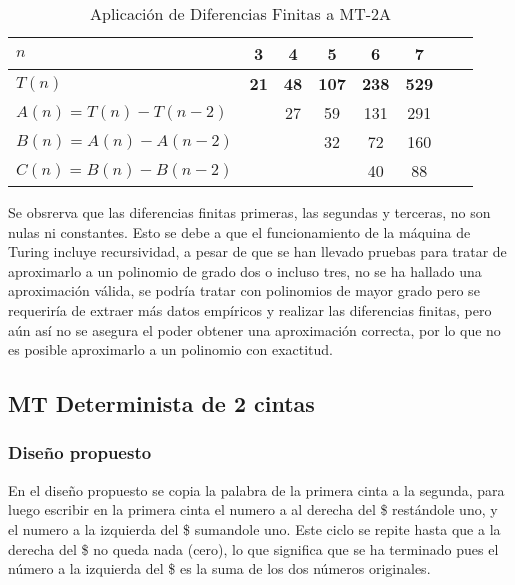 \begin{table}[h]
    \centering
    \begin{tabular}{|l|c|c|c|c|c|c|c|}
        \hline
        $n$ & \textbf{3} & \textbf{4} & \textbf{5} & \textbf{6} & \textbf{7}\\ \hline
        $T(n)$ & \textbf{21} & \textbf{48} & \textbf{107} & \textbf{238} & \textbf{529}      \\ \hline
        \hline
        $A(n) = T(n) - T(n-2)$ &    & 27 & 59 & 131 & 291 \\ \hline
        $B(n) = A(n) - A(n-2)$ &    &   & 32 & 72 & 160 \\ \hline
        $C(n) = B(n) - B(n-2)$ &    &   &    & 40 & 88 \\ \hline
    \end{tabular}
    \caption{Aplicación de Diferencias Finitas a MT-2A}
\end{table}

Se obsrerva que las diferencias finitas primeras, las segundas y terceras, no son nulas ni constantes. Esto se debe a que el funcionamiento de la máquina de Turing incluye recursividad, a pesar de que se han llevado pruebas para tratar de aproximarlo a un polinomio de grado dos o incluso tres, no se ha hallado una aproximación válida, se podría tratar con polinomios de mayor grado pero se requeriría de extraer más datos empíricos y realizar las diferencias finitas, pero aún así no se asegura el poder obtener una aproximación correcta, por lo que no es posible aproximarlo a un polinomio con exactitud. \medskip




\subsection{MT Determinista de 2 cintas}

\subsubsection*{Diseño propuesto}

En el diseño propuesto se copia la palabra de la primera cinta a la segunda, para luego escribir en la primera cinta el numero a al derecha del \$ restándole uno, y el numero a la izquierda del \$ sumandole uno. Este ciclo se repite hasta que a la derecha del \$ no queda nada (cero), lo que significa que se ha terminado pues el número a la izquierda del \$ es la suma de los dos números originales.\medskip

